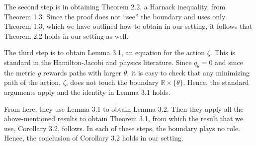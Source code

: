 \documentclass[11pt]{article}    %
\newcommand{\R}{\mathbb{R}}
\begin{document}
The second step is in obtaining Theorem 2.2, a Harnack inequality, from Theorem 1.3.  Since the proof does not ``see'' the boundary and uses only Theorem 1.3, which we have outlined how to obtain in our setting, it follows that Theorem 2.2 holds in our setting as well.

The third step is to obtain Lemma 3.1, an equation for the action $\zeta$.  This is standard in the Hamilton-Jacobi and physics literature.  Since $q_\theta = 0$ and since the metric $g$ rewards paths with larger $\theta$, it is easy to check that any minimizing path of the action, $\zeta$, does not touch the boundary $\R\times\{\underline\theta\}$.  Hence, the standard arguments apply and the identity in Lemma 3.1 holds.

From here, they use Lemma 3.1 to obtain Lemma 3.2.  Then they apply all the above-mentioned results to obtain Theorem 3.1, from which the result that we use, Corollary 3.2, follows.  In each of these steps, the boundary plays no role.  Hence, the conclusion of Corollary 3.2 holds in our setting.
















%
\end{document}
